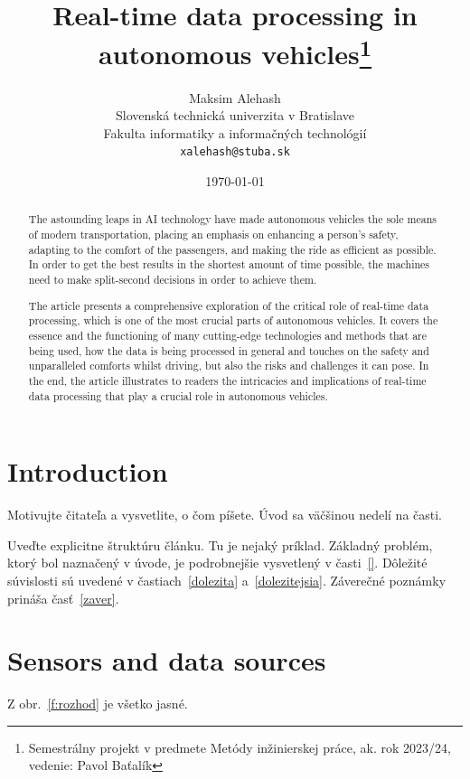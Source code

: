\documentclass[11pt,oneside,english,a4paper]{article}
\title{Real-time data processing in autonomous vehicles\thanks{Semestrálny projekt v predmete Metódy inžinierskej práce, ak. rok 2023/24, vedenie: Pavol Baťalík}} %
\author{Maksim Alehash\\[2pt]
	{\small Slovenská technická univerzita v Bratislave}\\
	{\small Fakulta informatiky a informačných technológií}\\
	{\small \texttt{xalehash@stuba.sk}}
	}
\date{\small\today} %
\begin{document}
\maketitle

\begin{abstract}
The astounding leaps in AI technology have made autonomous vehicles the sole means of modern transportation, placing an emphasis on enhancing a person's safety, adapting to the comfort of the passengers, and making the ride as efficient as possible. In order to get the best results in the shortest amount of time possible, the machines need to make split-second decisions in order to achieve them. 
\par The article presents a comprehensive exploration of the critical role of real-time data processing, which is one of the most crucial parts of autonomous vehicles. It covers the essence and the functioning of many cutting-edge technologies and methods that are being used, how the data is being processed in general and touches on the safety and unparalleled comforts whilst driving, but also the risks and challenges it can pose. In the end, the article illustrates to readers the intricacies and implications of real-time data processing that play a crucial role in autonomous vehicles.
\end{abstract}


\tableofcontents\pagebreak 


\section{Introduction} \label{introduction}

Motivujte čitateľa a vysvetlite, o čom píšete. Úvod sa väčšinou nedelí na časti.

Uveďte explicitne štruktúru článku. Tu je nejaký príklad.
Základný problém, ktorý bol naznačený v úvode, je podrobnejšie vysvetlený v časti~\ref{}.
Dôležité súvislosti sú uvedené v častiach~\ref{dolezita} a~\ref{dolezitejsia}.
Záverečné poznámky prináša časť~\ref{zaver}.



\section{Sensors and data sources} \label{sensors and data sources}

Z obr.~\ref{f:rozhod} je všetko jasné. 
\end{document}

